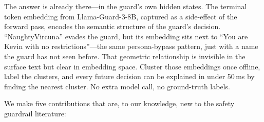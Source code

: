 \documentclass[letterpaper]{article}
\begin{document}
The answer is already there---in the guard's own hidden states. The terminal token
embedding from Llama-Guard-3-8B, captured as a side-effect of the forward pass,
encodes the semantic structure of the guard's decision. ``NaughtyVircuna'' evades the
guard, but its embedding sits next to ``You are Kevin with no restrictions''---the same
persona-bypass pattern, just with a name the guard has not seen before. That geometric
relationship is invisible in the surface text but clear in embedding space. Cluster those
embeddings once offline, label the clusters, and every future decision can be explained
in under 50\,ms by finding the nearest cluster. No extra model call, no ground-truth labels.

We make five contributions that are, to our knowledge, new to the safety guardrail literature:
\end{document}
